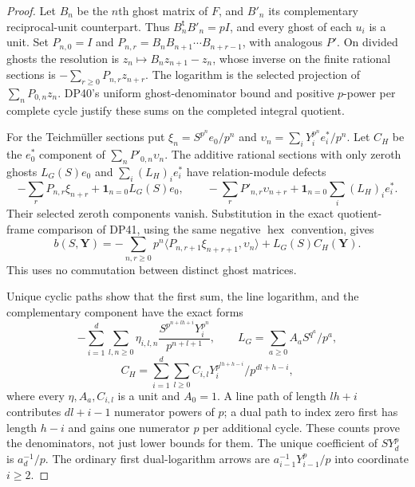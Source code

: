 \documentclass[11pt,a4paper]{article}
\theoremstyle{definition}\newtheorem{remark}[theorem]{Remark}
\begin{document}
\begin{proof}
Let $B_n$ be the $n$th ghost matrix of $F$, and $B'_n$ its complementary reciprocal-unit counterpart. Thus
$B_n^{\mathsf t}B'_n=pI$, and every ghost of each $u_i$ is a unit.
Set $P_{n,0}=I$ and
$P_{n,r}=B_nB_{n+1}\cdots B_{n+r-1}$, with analogous $P'$.
On divided ghosts the resolution is $z_n\mapsto B_nz_{n+1}-z_n$, whose inverse on the finite rational sections is
$-\sum_{r\ge0}P_{n,r}z_{n+r}$.
The logarithm is the selected projection of $\sum_nP_{0,n}z_n$.
DP40's uniform ghost-denominator bound and positive $p$-power per complete cycle justify these sums on the completed integral quotient.

For the Teichm\"uller sections put
$\xi_n=S^{p^n}e_0/p^n$ and
$\upsilon_n=\sum_iY_i^{p^n}e_i^*/p^n$.
Let $C_H$ be the $e_0^*$ component of $\sum_nP'_{0,n}\upsilon_n$.
The additive rational sections with only zeroth ghosts
$L_G(S)e_0$ and $\sum_i(L_H)_i e_i^*$ have relation-module defects
\[
 -\sum_rP_{n,r}\xi_{n+r}+\mathbf1_{n=0}L_G(S)e_0,\qquad
 -\sum_rP'_{n,r}\upsilon_{n+r}
       +\mathbf1_{n=0}\sum_i(L_H)_ie_i^*.
\]
Their selected zeroth components vanish. Substitution in the exact quotient-frame comparison of DP41, using the same negative $\operatorname{hex}$ convention, gives
\begin{equation}\label{eq:unitprimitive}
 b(S,\mathbf Y)=
 -\sum_{n,r\ge0}p^n
       \langle P_{n,r+1}\xi_{n+r+1},\upsilon_n\rangle
       +L_G(S)C_H(\mathbf Y).
\end{equation}
This uses no commutation between distinct ghost matrices.

Unique cyclic paths show that the first sum, the line logarithm, and the complementary component have the exact forms
\[
 -\sum_{i=1}^d\sum_{l,n\ge0}
   \eta_{i,l,n}\frac{S^{p^{n+lh+i}}Y_i^{p^n}}{p^{n+l+1}},\qquad
 L_G=\sum_{a\ge0}A_aS^{q^a}/p^a,
\]
\[
 C_H=\sum_{i=1}^d\sum_{l\ge0}
        C_{i,l}Y_i^{p^{lh+h-i}}/p^{dl+h-i},
\]
where every $\eta,A_a,C_{i,l}$ is a unit and $A_0=1$.
A line path of length $lh+i$ contributes $dl+i-1$ numerator powers of $p$; a dual path to index zero first has length $h-i$ and gains one numerator $p$ per additional cycle. These counts prove the denominators, not just lower bounds for them.
The unique coefficient of $SY_d^p$ is $a_d^{-1}/p$.
The ordinary first dual-logarithm arrows are
$a_{i-1}^{-1}Y_{i-1}^p/p$ into coordinate $i\ge2$.


\end{proof}
\end{document}
